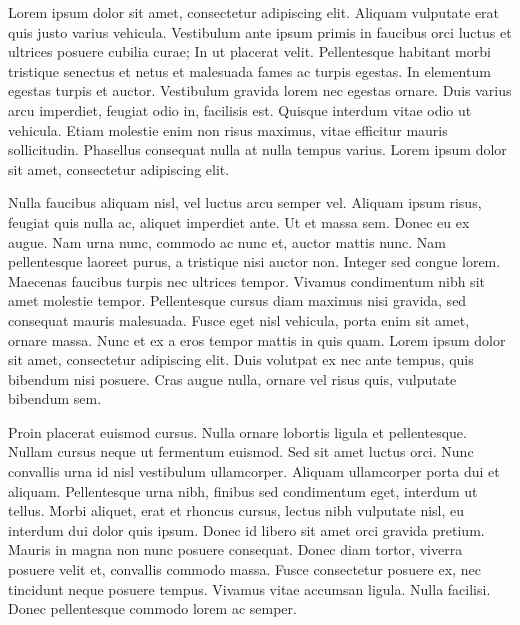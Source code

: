 Lorem ipsum dolor sit amet, consectetur adipiscing elit. Aliquam vulputate erat quis justo varius vehicula. Vestibulum ante ipsum primis in faucibus orci luctus et ultrices posuere cubilia curae; In ut placerat velit. Pellentesque habitant morbi tristique senectus et netus et malesuada fames ac turpis egestas. In elementum egestas turpis et auctor. Vestibulum gravida lorem nec egestas ornare. Duis varius arcu imperdiet, feugiat odio in, facilisis est. Quisque interdum vitae odio ut vehicula. Etiam molestie enim non risus maximus, vitae efficitur mauris sollicitudin. Phasellus consequat nulla at nulla tempus varius. Lorem ipsum dolor sit amet, consectetur adipiscing elit.

Nulla faucibus aliquam nisl, vel luctus arcu semper vel. Aliquam ipsum risus, feugiat quis nulla ac, aliquet imperdiet ante. Ut et massa sem. Donec eu ex augue. Nam urna nunc, commodo ac nunc et, auctor mattis nunc. Nam pellentesque laoreet purus, a tristique nisi auctor non. Integer sed congue lorem. Maecenas faucibus turpis nec ultrices tempor. Vivamus condimentum nibh sit amet molestie tempor. Pellentesque cursus diam maximus nisi gravida, sed consequat mauris malesuada. Fusce eget nisl vehicula, porta enim sit amet, ornare massa. Nunc et ex a eros tempor mattis in quis quam. Lorem ipsum dolor sit amet, consectetur adipiscing elit. Duis volutpat ex nec ante tempus, quis bibendum nisi posuere. Cras augue nulla, ornare vel risus quis, vulputate bibendum sem.

Proin placerat euismod cursus. Nulla ornare lobortis ligula et pellentesque. Nullam cursus neque ut fermentum euismod. Sed sit amet luctus orci. Nunc convallis urna id nisl vestibulum ullamcorper. Aliquam ullamcorper porta dui et aliquam. Pellentesque urna nibh, finibus sed condimentum eget, interdum ut tellus. Morbi aliquet, erat et rhoncus cursus, lectus nibh vulputate nisl, eu interdum dui dolor quis ipsum. Donec id libero sit amet orci gravida pretium. Mauris in magna non nunc posuere consequat. Donec diam tortor, viverra posuere velit et, convallis commodo massa. Fusce consectetur posuere ex, nec tincidunt neque posuere tempus. Vivamus vitae accumsan ligula. Nulla facilisi. Donec pellentesque commodo lorem ac semper.